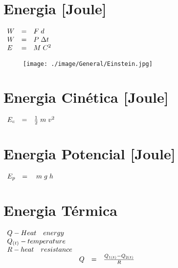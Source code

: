 \newline
\vspace{.6cm}
\newline
\begin{minipage}[c]{.5\linewidth}
	\section*{Energia [Joule]}
	\vspace{.1cm}
	\Large
	$\begin{array}{ l l l }
		W & = & F \; d \\
		W & = & P \; \Delta t \\
		E & = & M \; C^{2}
	\end{array}$
\end{minipage}
\begin{minipage}[c]{.5\linewidth}
	\begin{figure}[H]
		\flushleft
		\texttt{[image: ./image/General/Einstein.jpg]}
		\caption*{\cite{book-2}}
		\label{Einstein}
	\end{figure}
\end{minipage}
\newline
\vspace{.6cm}
\newline
\begin{minipage}[!b]{.5\linewidth}
	\section*{Energia Cinética [Joule]}
	\Large
	$\begin{array}{ l l l }
		E_{c} & = & \frac{1}{2} \; m \; v^{2}
	\end{array}$
\end{minipage}
\begin{minipage}[!b]{.5\linewidth}
	\section*{Energia Potencial [Joule]}
	\Large
	$\begin{array}{ l l l }
		E_{p} & = & \; m \; g \; h
	\end{array}$
\end{minipage}
\newline
\vspace{.6cm}
\newline
\begin{minipage}[l]{\linewidth}
	\section*{Energia Térmica}
	\Large
	$\begin{array}{ l l l l }
		Q - Heat \quad energy & & & \\
		Q_{(t)} - temperature & & & \\
		R - heat \quad resistance & & & \\
		& Q & = & \frac{Q_{1(t)} - Q_{2(t)}}{R}
	\end{array}$
\end{minipage}
